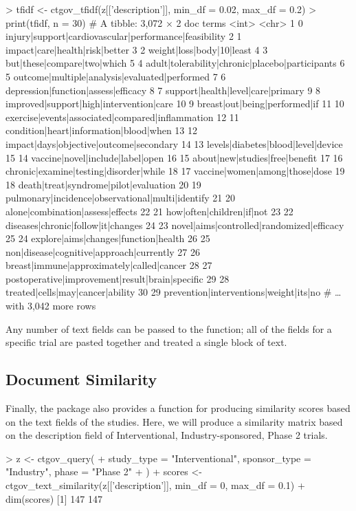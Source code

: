 \begin{example}
> tfidf <- ctgov_tfidf(z[['description']], min_df = 0.02, max_df = 0.2)
> print(tfidf, n = 30)
# A tibble: 3,072 × 2
     doc terms
   <int> <chr>
 1     0 injury|support|cardiovascular|performance|feasibility
 2     1 impact|care|health|risk|better
 3     2 weight|loss|body|10|least
 4     3 but|these|compare|two|which
 5     4 adult|tolerability|chronic|placebo|participants
 6     5 outcome|multiple|analysis|evaluated|performed
 7     6 depression|function|assess|efficacy
 8     7 support|health|level|care|primary
 9     8 improved|support|high|intervention|care
10     9 breast|out|being|performed|if
11    10 exercise|events|associated|compared|inflammation
12    11 condition|heart|information|blood|when
13    12 impact|days|objective|outcome|secondary
14    13 levels|diabetes|blood|level|device
15    14 vaccine|novel|include|label|open
16    15 about|new|studies|free|benefit
17    16 chronic|examine|testing|disorder|while
18    17 vaccine|women|among|those|dose
19    18 death|treat|syndrome|pilot|evaluation
20    19 pulmonary|incidence|observational|multi|identify
21    20 alone|combination|assess|effects
22    21 how|often|children|if|not
23    22 diseases|chronic|follow|it|changes
24    23 novel|aims|controlled|randomized|efficacy
25    24 explore|aims|changes|function|health
26    25 non|disease|cognitive|approach|currently
27    26 breast|immune|approximately|called|cancer
28    27 postoperative|improvement|result|brain|specific
29    28 treated|cells|may|cancer|ability
30    29 prevention|interventions|weight|its|no
# … with 3,042 more rows
\end{example}

Any number of text fields can be passed to the  function; all of
the fields for a specific trial are pasted together and treated a single block
of text.

\subsection{Document Similarity}

Finally, the package also provides a function for producing similarity scores
based on the text fields of the studies. Here, we will produce a similarity
matrix based on the description field of Interventional, Industry-sponsored,
Phase 2 trials.

\begin{example}
> z <- ctgov_query(
+    study_type = "Interventional", sponsor_type = "Industry", phase = "Phase 2"
+  )
+  scores <- ctgov_text_similarity(z[['description']], min_df = 0, max_df = 0.1)
+  dim(scores)
[1] 147 147
\end{example}

